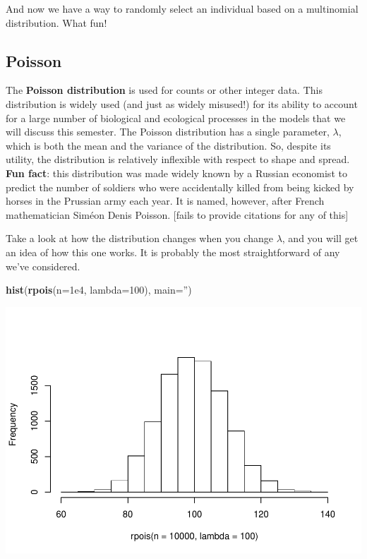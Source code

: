 \documentclass[
]{book}
\newenvironment{Shaded}{\begin{snugshade}}{\end{snugshade}}
\newcommand{\DataTypeTok}[1]{\textcolor[rgb]{0.13,0.29,0.53}{#1}}
\newcommand{\DecValTok}[1]{\textcolor[rgb]{0.00,0.00,0.81}{#1}}
\newcommand{\FloatTok}[1]{\textcolor[rgb]{0.00,0.00,0.81}{#1}}
\newcommand{\KeywordTok}[1]{\textcolor[rgb]{0.13,0.29,0.53}{\textbf{#1}}}
\newcommand{\NormalTok}[1]{#1}
\newcommand{\StringTok}[1]{\textcolor[rgb]{0.31,0.60,0.02}{#1}}
\begin{document}
And now we have a way to randomly select an individual based on a multinomial distribution. What fun!

\hypertarget{poisson}{%
\subsection{Poisson}\label{poisson}}

The \textbf{Poisson distribution} is used for counts or other integer data. This distribution is widely used (and just as widely misused!) for its ability to account for a large number of biological and ecological processes in the models that we will discuss this semester. The Poisson distribution has a single parameter, \(\lambda\), which is both the mean and the variance of the distribution. So, despite its utility, the distribution is relatively inflexible with respect to shape and spread. \textbf{Fun fact}: this distribution was made widely known by a Russian economist to predict the number of soldiers who were accidentally killed from being kicked by horses in the Prussian army each year. It is named, however, after French mathematician Siméon Denis Poisson. {[}fails to provide citations for any of this{]}

Take a look at how the distribution changes when you change \(\lambda\), and you will get an idea of how this one works. It is probably the most straightforward of any we've considered.

\begin{Shaded}
\begin{Highlighting}[]
\KeywordTok{hist}\NormalTok{(}\KeywordTok{rpois}\NormalTok{(}\DataTypeTok{n=}\FloatTok{1e4}\NormalTok{, }\DataTypeTok{lambda=}\DecValTok{100}\NormalTok{), }\DataTypeTok{main=}\StringTok{''}\NormalTok{)}
\end{Highlighting}
\end{Shaded}

\includegraphics{worstr_files/figure-latex/unnamed-chunk-138-1.pdf}
\end{document}

